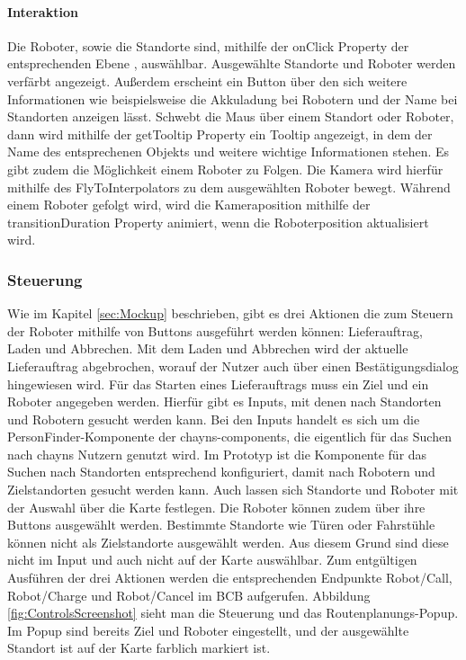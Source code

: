 \paragraph{Interaktion}
Die Roboter, sowie die Standorte sind, mithilfe der onClick Property der entsprechenden Ebene \cite{DeckglInteractivity}, auswählbar. Ausgewählte Standorte und Roboter werden verfärbt angezeigt. Außerdem erscheint ein Button über den sich weitere Informationen wie beispielsweise die Akkuladung bei Robotern und der Name bei Standorten anzeigen lässt. Schwebt die Maus über einem Standort oder Roboter, dann wird mithilfe der getTooltip Property \cite{DeckglDeckClass} ein Tooltip angezeigt, in dem der Name des entsprechenen Objekts und weitere wichtige Informationen stehen. Es gibt zudem die Möglichkeit einem Roboter zu Folgen. Die Kamera wird hierfür mithilfe des FlyToInterpolators \cite{DeckglFlyToInterpolator} zu dem ausgewählten Roboter bewegt. Während einem Roboter gefolgt wird, wird die Kameraposition mithilfe der transitionDuration Property \cite{DeckglAnimationsAndTransitions} animiert, wenn die Roboterposition aktualisiert wird.

\subsubsection{Steuerung}
Wie im Kapitel \ref{sec:Mockup} beschrieben, gibt es drei Aktionen die zum Steuern der Roboter mithilfe von Buttons ausgeführt werden können: Lieferauftrag, Laden und Abbrechen. Mit dem Laden und Abbrechen wird der aktuelle Lieferauftrag abgebrochen, worauf der Nutzer auch über einen Bestätigungsdialog hingewiesen wird. Für das Starten eines Lieferauftrags muss ein Ziel und ein Roboter angegeben werden. Hierfür gibt es Inputs, mit denen nach Standorten und Robotern gesucht werden kann. Bei den Inputs handelt es sich um die PersonFinder-Komponente \cite{ChaynsPersonFinder} der chayns-components, die eigentlich für das Suchen nach chayns Nutzern genutzt wird. Im Prototyp ist die Komponente für das Suchen nach Standorten entsprechend konfiguriert, damit nach Robotern und Zielstandorten gesucht werden kann. Auch lassen sich Standorte und Roboter mit der Auswahl über die Karte festlegen. Die Roboter können zudem über ihre Buttons ausgewählt werden. Bestimmte Standorte wie Türen oder Fahrstühle können nicht als Zielstandorte ausgewählt werden. Aus diesem Grund sind diese nicht im Input und auch nicht auf der Karte auswählbar. Zum entgültigen Ausführen der drei Aktionen werden die entsprechenden Endpunkte Robot/Call, Robot/Charge und Robot/Cancel im \ac{BCB} \cite{BCBSwagger} aufgerufen. Abbildung \ref{fig:ControlsScreenshot} sieht man die Steuerung und das Routenplanungs-Popup. Im Popup sind bereits Ziel und Roboter eingestellt, und der ausgewählte Standort ist auf der Karte farblich markiert ist.

